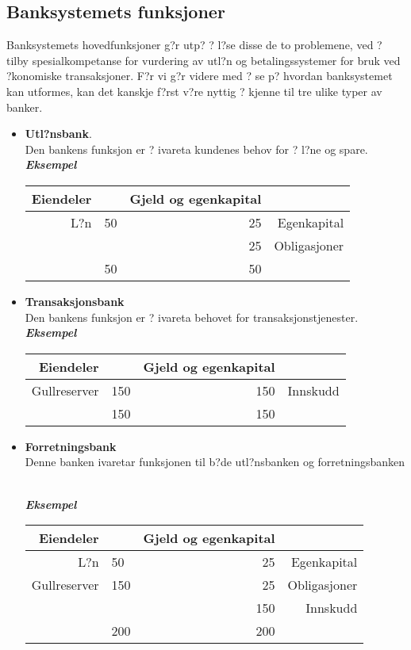 \documentclass[a4paper,notitlepage]{article}
\begin{document}
\subsection{Banksystemets funksjoner}
Banksystemets hovedfunksjoner g?r utp? ? l?se disse de to problemene, ved ? tilby spesialkompetanse for vurdering av utl?n og betalingssystemer for bruk ved ?konomiske transaksjoner. F?r vi g?r videre med ? se p? hvordan banksystemet kan utformes, kan det kanskje f?rst v?re nyttig ? kjenne til tre ulike typer av banker.
\begin{itemize}
\item \textbf{Utl?nsbank}.\\
Den bankens funksjon er ? ivareta kundenes behov  for  ? l?ne og spare.\\

\noindent\textbf{\emph{Eksempel}}\\
\begin{tabular}{rlrr}
    \textbf{Eiendeler} & \textbf{} & \textbf{Gjeld og egenkapital} & \textbf{} \\
\hline    L?n   & 50    & 25    & Egenkapital \\
          &       & 25    & Obligasjoner \\
\hline          & 50    & 50    &  \\
\end{tabular}%
\end{itemize}
\begin{itemize}
\item \textbf{Transaksjonsbank}\\
Den bankens funksjon er ? ivareta behovet for transaksjonstjenester.\\

\noindent\textbf{\emph{Eksempel}}\

\begin{tabular}{rlrr}
 \textbf{Eiendeler} & \textbf{} & \textbf{Gjeld og egenkapital} & \textbf{}\\
\hline    Gullreserver &  150   & 150   & Innskudd \\
\hline                 & 150   & 150   &  \\
\end{tabular}
\end{itemize}
\begin{itemize}
\item \textbf{Forretningsbank} \\
Denne banken ivaretar funksjonen til b?de utl?nsbanken og forretningsbanken

\noindent \\\textbf{\emph{Eksempel}}\\
\begin{tabular}{rlrr}
    \textbf{Eiendeler} & \textbf{} & \textbf{Gjeld og egenkapital} & \textbf{} \\
\hline    L?n   & 50    & 25    & Egenkapital \\
    Gullreserver  &  150   & 25    & Obligasjoner \\
          &       & 150   & Innskudd \\
\hline          & 200   & 200   &  \\
\end{tabular}%
\end{itemize}
\end{document}
